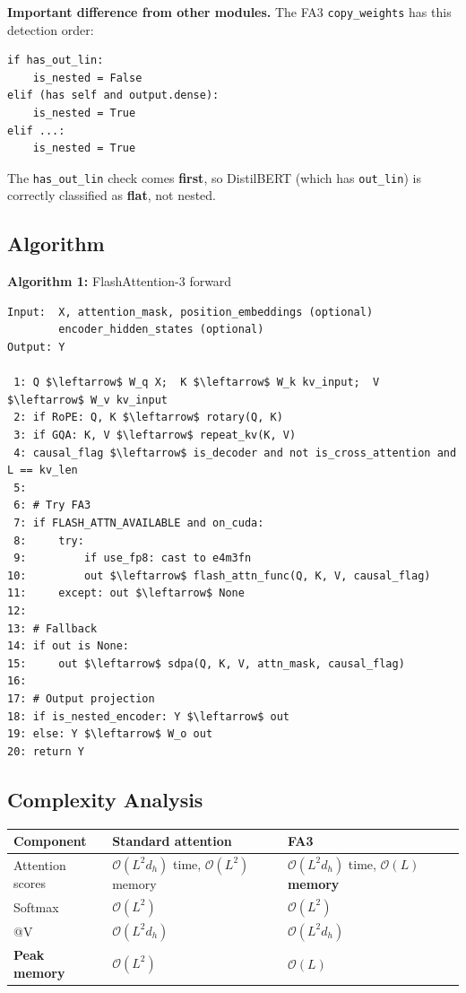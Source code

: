 \textbf{Important difference from other modules.} The FA3 \texttt{copy\_weights} has 
this detection order:

\begin{lstlisting}
if has_out_lin:
    is_nested = False
elif (has self and output.dense):
    is_nested = True
elif ...:
    is_nested = True
\end{lstlisting}

The \texttt{has\_out\_lin} check comes \textbf{first}, so DistilBERT (which has \texttt{out\_lin}) 
is correctly classified as \textbf{flat}, not nested.

\subsection{Algorithm}

\textbf{Algorithm 1:} FlashAttention-3 forward
\begin{lstlisting}
Input:  X, attention_mask, position_embeddings (optional)
        encoder_hidden_states (optional)
Output: Y

 1: Q $\leftarrow$ W_q X;  K $\leftarrow$ W_k kv_input;  V $\leftarrow$ W_v kv_input
 2: if RoPE: Q, K $\leftarrow$ rotary(Q, K)
 3: if GQA: K, V $\leftarrow$ repeat_kv(K, V)
 4: causal_flag $\leftarrow$ is_decoder and not is_cross_attention and L == kv_len
 5:
 6: # Try FA3
 7: if FLASH_ATTN_AVAILABLE and on_cuda:
 8:     try:
 9:         if use_fp8: cast to e4m3fn
10:         out $\leftarrow$ flash_attn_func(Q, K, V, causal_flag)
11:     except: out $\leftarrow$ None
12:
13: # Fallback
14: if out is None:
15:     out $\leftarrow$ sdpa(Q, K, V, attn_mask, causal_flag)
16:
17: # Output projection
18: if is_nested_encoder: Y $\leftarrow$ out
19: else: Y $\leftarrow$ W_o out
20: return Y
\end{lstlisting}

\subsection{Complexity Analysis}

\begin{table}[H]
\centering
\small
\begin{tabular}{lll}
\toprule
\textbf{Component} & \textbf{Standard attention} & \textbf{FA3} \\
\midrule
Attention scores & $\mathcal{O}(L^2 d_h)$ time, $\mathcal{O}(L^2)$ memory & $\mathcal{O}(L^2 d_h)$ time, \textbf{$\mathcal{O}(L)$ memory} \\
Softmax & $\mathcal{O}(L^2)$ & $\mathcal{O}(L^2)$ \\
@V & $\mathcal{O}(L^2 d_h)$ & $\mathcal{O}(L^2 d_h)$ \\
\textbf{Peak memory} & $\mathcal{O}(L^2)$ & \textbf{$\mathcal{O}(L)$} \\
\bottomrule
\end{tabular}
\end{table}

